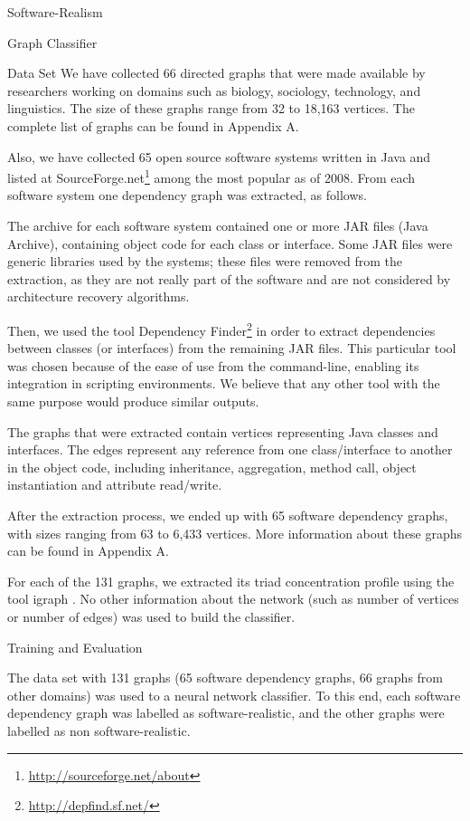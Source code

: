 \documentclass[11pt,twocolumn,a4paper,english]{article}
\begin{document}
\begin{section}{Software-Realism}
\begin{subsection}{Graph Classifier}
\begin{subsubsection}{Data Set}
	We have collected 66 directed graphs that were made available by researchers working on domains such as biology, sociology, technology, and linguistics. The size of these graphs range from 32 to 18,163 vertices. The complete list of graphs can be found in Appendix A. %
	
	Also, we have collected 65 open source software systems written in Java and listed at SourceForge.net\footnote{\url{http://sourceforge.net/about}} among the most popular as of 2008. From each software system one dependency graph was extracted, as follows.
	
	The archive for each software system contained one or more JAR files (Java Archive), containing object code for each class or interface. Some JAR files were generic libraries used by the systems; these files were removed from the extraction, as they are not really part of the software and are not considered by architecture recovery algorithms.
	
	Then, we used the tool Dependency Finder\footnote{\url{http://depfind.sf.net/}} in order to extract dependencies between classes (or interfaces) from the remaining JAR files. This particular tool was chosen because of the ease of use from the command-line, enabling its integration in scripting environments. We believe that any other tool with the same purpose would produce similar outputs.
	
	The graphs that were extracted contain vertices representing Java classes and interfaces. The edges represent any reference from one class/interface to another in the object code, including inheritance, aggregation, method call, object instantiation and attribute read/write.
	
	After the extraction process, we ended up with 65 software dependency graphs, with sizes ranging from 63 to 6,433 vertices. More information about these graphs can be found in Appendix A. %
	
	For each of the 131 graphs, we extracted its triad concentration profile using the tool igraph \cite{igraph}. No other information about the network (such as number of vertices or number of edges) was used to build the classifier.

\end{subsubsection}

\begin{subsubsection}{Training and Evaluation}
	
	The data set with 131 graphs (65 software dependency graphs, 66 graphs from other domains) was used to a neural network classifier. To this end, each software dependency graph was labelled as software-realistic, and the other graphs were labelled as non software-realistic. 
	

\end{subsubsection}
\end{subsection}
\end{section}
\end{document}
